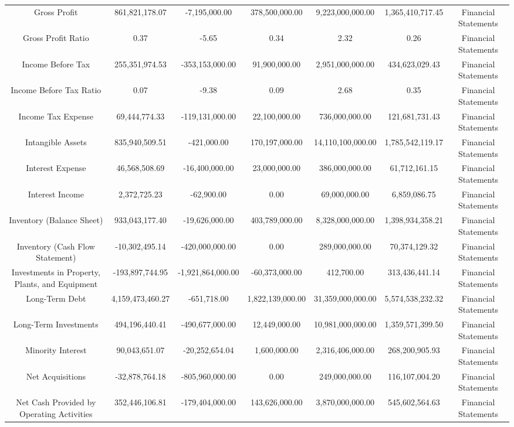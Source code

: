 \begin{longtable}{ccccccc}
Gross Profit & 861,821,178.07 & -7,195,000.00 & 378,500,000.00 & 9,223,000,000.00 & 1,365,410,717.45 & Financial Statements \\
Gross Profit Ratio & 0.37 & -5.65 & 0.34 & 2.32 & 0.26 & Financial Statements \\
Income Before Tax & 255,351,974.53 & -353,153,000.00 & 91,900,000.00 & 2,951,000,000.00 & 434,623,029.43 & Financial Statements \\
Income Before Tax Ratio & 0.07 & -9.38 & 0.09 & 2.68 & 0.35 & Financial Statements \\
Income Tax Expense & 69,444,774.33 & -119,131,000.00 & 22,100,000.00 & 736,000,000.00 & 121,681,731.43 & Financial Statements \\
Intangible Assets & 835,940,509.51 & -421,000.00 & 170,197,000.00 & 14,110,100,000.00 & 1,785,542,119.17 & Financial Statements \\
Interest Expense & 46,568,508.69 & -16,400,000.00 & 23,000,000.00 & 386,000,000.00 & 61,712,161.15 & Financial Statements \\
Interest Income & 2,372,725.23 & -62,900.00 & 0.00 & 69,000,000.00 & 6,859,086.75 & Financial Statements \\
Inventory (Balance Sheet) & 933,043,177.40 & -19,626,000.00 & 403,789,000.00 & 8,328,000,000.00 & 1,398,934,358.21 & Financial Statements \\
Inventory (Cash Flow Statement) & -10,302,495.14 & -420,000,000.00 & 0.00 & 289,000,000.00 & 70,374,129.32 & Financial Statements \\
Investments in Property, Plants, and Equipment & -193,897,744.95 & -1,921,864,000.00 & -60,373,000.00 & 412,700.00 & 313,436,441.14 & Financial Statements \\
Long-Term Debt & 4,159,473,460.27 & -651,718.00 & 1,822,139,000.00 & 31,359,000,000.00 & 5,574,538,232.32 & Financial Statements \\
Long-Term Investments & 494,196,440.41 & -490,677,000.00 & 12,449,000.00 & 10,981,000,000.00 & 1,359,571,399.50 & Financial Statements \\
Minority Interest & 90,043,651.07 & -20,252,654.04 & 1,600,000.00 & 2,316,406,000.00 & 268,200,905.93 & Financial Statements \\
Net Acquisitions & -32,878,764.18 & -805,960,000.00 & 0.00 & 249,000,000.00 & 116,107,004.20 & Financial Statements \\
Net Cash Provided by Operating Activities & 352,446,106.81 & -179,404,000.00 & 143,626,000.00 & 3,870,000,000.00 & 545,602,564.63 & Financial Statements \\

\end{longtable}

